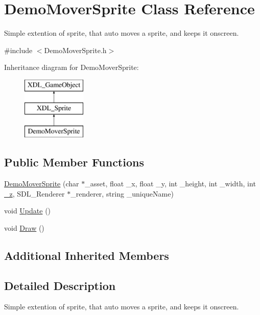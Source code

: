\hypertarget{class_demo_mover_sprite}{\section{Demo\-Mover\-Sprite Class Reference}
\label{class_demo_mover_sprite}
}


Simple extention of sprite, that auto moves a sprite, and keeps it onscreen.  




{\ttfamily \#include $<$Demo\-Mover\-Sprite.\-h$>$}

Inheritance diagram for Demo\-Mover\-Sprite\-:\begin{figure}[H]
\begin{center}
\leavevmode
\includegraphics[height=3.000000cm]{class_demo_mover_sprite}
\end{center}
\end{figure}
\subsection*{Public Member Functions}
\begin{DoxyCompactItemize}
\item 
\hyperlink{class_demo_mover_sprite_a82f641d20ad4e660b4f200f340109148}{Demo\-Mover\-Sprite} (char $\ast$\-\_\-asset, float \-\_\-x, float \-\_\-y, int \-\_\-height, int \-\_\-width, int \hyperlink{class_x_d_l___game_object_a62a08106992c783507c669f71a6dd6a6}{\-\_\-z}, S\-D\-L\-\_\-\-Renderer $\ast$\-\_\-renderer, string \-\_\-unique\-Name)
\item 
void \hyperlink{class_demo_mover_sprite_a0b7efa613730b6e41202ed9da517f0aa}{Update} ()
\item 
void \hyperlink{class_demo_mover_sprite_a4dae3800a23e9ed5f68cd83b05be8ab8}{Draw} ()
\end{DoxyCompactItemize}
\subsection*{Additional Inherited Members}


\subsection{Detailed Description}
Simple extention of sprite, that auto moves a sprite, and keeps it onscreen. 

